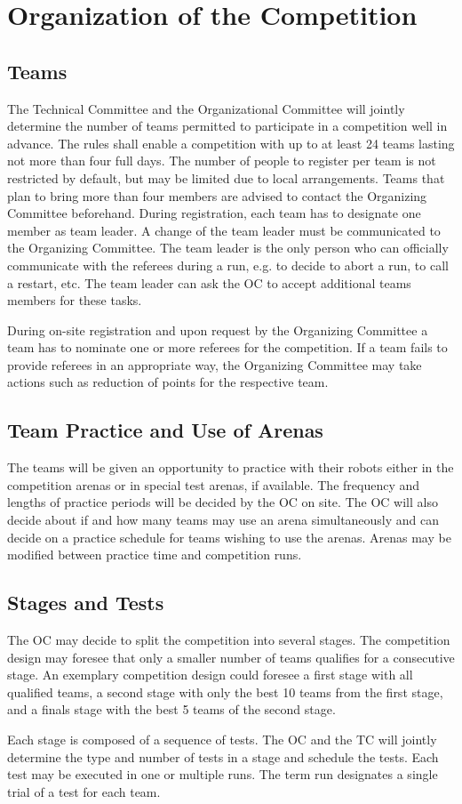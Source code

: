\section{Organization of the Competition}\label{sec:participation_in_the_competition}


\subsection{Teams}
The Technical Committee and the Organizational Committee will jointly determine the number of teams permitted to participate in a competition well in advance. The rules shall enable a competition with up to at least 24 teams lasting not more than four full days.
The number of people to register per team is not restricted by default, but may be limited due to local arrangements. Teams that plan to bring more than four members are advised to contact the Organizing Committee beforehand. 
During registration, each team has to designate one member as team leader. A change of the team leader must be communicated to the Organizing Committee. The team leader is the only person who can officially communicate with the referees during a run, e.g. to decide to abort a run, to call a restart, etc. The team leader can ask the OC to accept additional teams members for these tasks. 
\par
During on-site registration and upon request by the Organizing Committee a team has to nominate one or more referees for the competition. If a team fails to provide referees in an appropriate way, the Organizing Committee may take actions such as reduction of points for the respective team.

\subsection{Team Practice and Use of Arenas}
The teams will be given an opportunity to practice with their robots either in the competition arenas or in special test arenas, if available. The frequency and lengths of practice periods will be decided by the OC on site. The OC will also decide about if and how many teams may use an arena simultaneously and can decide on a practice schedule for teams wishing to use the arenas. Arenas may be modified between practice time and competition runs. 
 
\subsection{Stages and Tests}
The OC may decide to split the competition into several stages. The competition design may foresee that only a smaller number of teams qualifies for a consecutive stage. An exemplary competition design could foresee a first stage with all qualified teams, a second stage with only the best 10 teams from the first stage, and a finals stage with the best 5 teams of the second stage. 
\par
Each stage is composed of a sequence of tests. The OC and the TC will jointly determine the type and number of tests in a stage and schedule the tests. 
Each test may be executed in one or multiple runs. The term run designates a single trial of a test for each team. 

